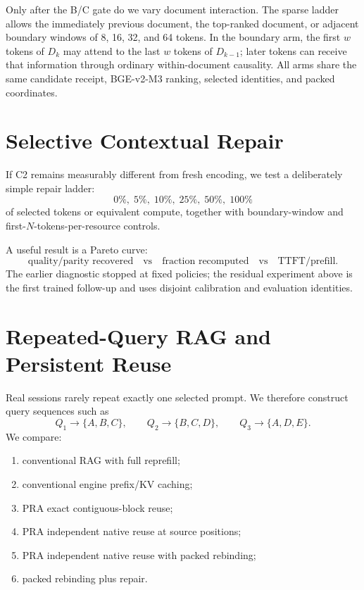 \documentclass[11pt]{article}
\begin{document}
Only after the B/C gate do we vary document interaction. The sparse ladder
allows the immediately previous document, the top-ranked document, or
adjacent boundary windows of 8, 16, 32, and 64 tokens. In the boundary arm,
the first $w$ tokens of $D_k$ may attend to the last $w$ tokens of $D_{k-1}$;
later tokens can receive that information through ordinary within-document
causality. All arms share the same candidate receipt, BGE-v2-M3 ranking,
selected identities, and packed coordinates.

\section{Selective Contextual Repair}

If C2 remains measurably different from fresh encoding, we test a deliberately simple repair ladder:
\[
0\%,\;5\%,\;10\%,\;25\%,\;50\%,\;100\%
\]
of selected tokens or equivalent compute, together with boundary-window and first-$N$-tokens-per-resource controls.

A useful result is a Pareto curve:
\[
\text{quality/parity recovered}
\quad\text{vs}\quad
\text{fraction recomputed}
\quad\text{vs}\quad
\text{TTFT/prefill}.
\]
The earlier diagnostic stopped at fixed policies; the residual experiment
above is the first trained follow-up and uses disjoint calibration and
evaluation identities.

\section{Repeated-Query RAG and Persistent Reuse}

Real sessions rarely repeat exactly one selected prompt.  We therefore construct query sequences such as
\[
Q_1\rightarrow\{A,B,C\},\qquad
Q_2\rightarrow\{B,C,D\},\qquad
Q_3\rightarrow\{A,D,E\}.
\]
We compare:
\begin{enumerate}[leftmargin=*]
    \item conventional RAG with full reprefill;
    \item conventional engine prefix/KV caching;
    \item PRA exact contiguous-block reuse;
    \item PRA independent native reuse at source positions;
    \item PRA independent native reuse with packed rebinding;
    \item packed rebinding plus repair.
\end{enumerate}
\end{document}

